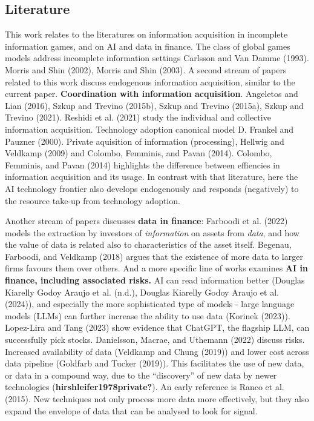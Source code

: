\documentclass[
]{article}
\theoremstyle{plain}
\theoremstyle{remark}
\begin{document}
\subsection{Literature}\label{literature}

This work relates to the literatures on information acquisition in
incomplete information games, and on AI and data in finance. The class
of global games models address incomplete information settings Carlsson
and Van Damme (1993). Morris and Shin (2002), Morris and Shin (2003). A
second stream of papers related to this work discuss endogenous
information acquisition, similar to the current paper.
\textbf{Coordination with information acquisition}. Angeletos and Lian
(2016), Szkup and Trevino (2015b), Szkup and Trevino (2015a), Szkup and
Trevino (2021). Reshidi et al. (2021) study the individual and
collective information acquisition. Technology adoption canonical model
D. Frankel and Pauzner (2000). Private aquisition of information
(processing), Hellwig and Veldkamp (2009) and Colombo, Femminis, and
Pavan (2014). Colombo, Femminis, and Pavan (2014) highlights the
difference between effiencies in information acquisition and its usage.
In contrast with that literature, here the AI technology frontier also
develops endogenously and responds (negatively) to the resource take-up
from technology adoption.

Another stream of papers discusses \textbf{data in finance}: Farboodi et
al. (2022) models the extraction by investors of \emph{information} on
assets from \emph{data}, and how the value of data is related also to
characteristics of the asset itself. Begenau, Farboodi, and Veldkamp
(2018) argues that the existence of more data to larger firms favours
them over others. And a more specific line of works examines \textbf{AI
in finance, including associated risks.} AI can read information better
(Douglas Kiarelly Godoy Araujo et al. (n.d.), Douglas Kiarelly Godoy
Araujo et al. (2024)), and especially the more sophisticated type of
models - large language models (LLMs) can further increase the ability
to use data (Korinek (2023)). Lopez-Lira and Tang (2023) show evidence
that ChatGPT, the flagship LLM, can successfully pick stocks.
Danielsson, Macrae, and Uthemann (2022) discuss risks. Increased
availability of data (Veldkamp and Chung (2019)) and lower cost across
data pipeline (Goldfarb and Tucker (2019)). This facilitates the use of
new data, or data in a compound way, due to the ``discovery'' of new
data by newer technologies (\textbf{hirshleifer1978private?}). An early
reference is Ranco et al. (2015). New techniques not only process more
data more effectively, but they also expand the envelope of data that
can be analysed to look for signal.
\end{document}
